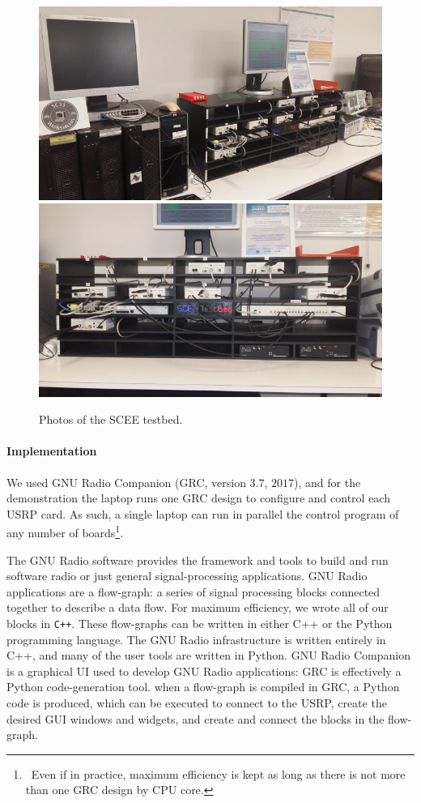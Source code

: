 \begin{figure}[!t]
    \centering
    \includegraphics[width=0.65\linewidth]{2-Chapters/4-Chapter/IEEE_WCNC_2019__DemoICT.git/pictures/SCEE_TestBed1.jpg}
    \vspace*{20pt}
    \includegraphics[width=0.65\linewidth]{2-Chapters/4-Chapter/IEEE_WCNC_2019__DemoICT.git/pictures/SCEE_TestBed2.jpg}
    \caption{Photos of the SCEE testbed.}
    \label{fig:42:photosSCEETestBed}
\end{figure}


\paragraph{Implementation}

We used GNU Radio Companion (GRC, version $3.7$, $2017$),
and for the demonstration the laptop runs
one GRC design to configure and control each USRP card.
As such, a single laptop can run in parallel the control program of any number of boards\footnote{~Even if in practice, maximum efficiency is kept as long as there is not more than one GRC design by CPU core.}.

The GNU Radio software provides the framework and tools to build and run software radio or just general signal-processing applications.
GNU Radio applications are a flow-graph: a series of signal processing blocks connected together to describe a data flow.
For maximum efficiency, we wrote all of our blocks in \texttt{C++}.
These flow-graphs can be written in either C++ or the Python programming language. The GNU Radio infrastructure is written entirely in C++, and many of the user tools are written in Python.
GNU Radio Companion is a graphical UI used to develop GNU Radio applications:
GRC is effectively a Python code-generation tool.
when a flow-graph is compiled in GRC, a Python code is produced, which can be executed to connect to the USRP,
create the desired GUI windows and widgets, and create and connect the blocks in the flow-graph.



